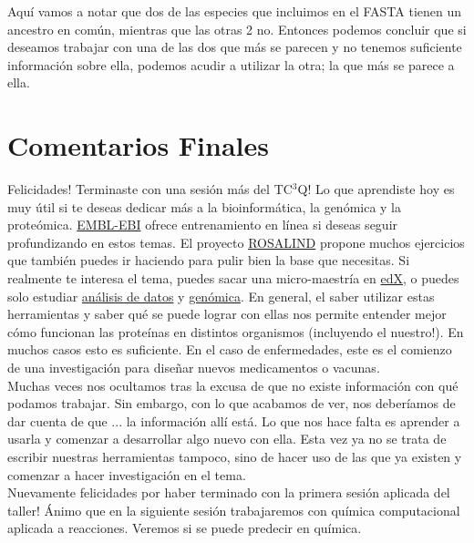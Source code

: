\documentclass[10pt,letterpaper]{article}
\begin{document}
Aqu\'i vamos a notar que dos de las especies que incluimos en el FASTA tienen un ancestro en com\'un, mientras que las otras 2 no. Entonces podemos concluir que si deseamos trabajar con una de las dos que m\'as se parecen y no tenemos suficiente informaci\'on sobre ella, podemos acudir a utilizar la otra; la que m\'as se parece a ella.

\section{Comentarios Finales}
Felicidades! Terminaste con una sesi\'on m\'as del TC$^3$Q! Lo que aprendiste hoy es muy \'util si te deseas dedicar m\'as a la bioinform\'atica, la gen\'omica y la prote\'omica. \href{http://www.ebi.ac.uk/training/online/}{EMBL-EBI} ofrece entrenamiento en l\'inea si deseas seguir profundizando en estos temas. El proyecto \href{http://rosalind.info/problems/locations/}{ROSALIND} propone muchos ejercicios que tambi\'en puedes ir haciendo para pulir bien la base que necesitas. Si realmente te interesa el tema, puedes sacar una micro-maestr\'ia en \href{https://www.edx.org/micromasters/bioinformatics}{edX}, o puedes solo estudiar \href{https://www.edx.org/xseries/data-analysis-life-sciences}{an\'alisis de datos} y \href{https://www.edx.org/xseries/genomics-data-analysis}{gen\'omica}. En general, el saber utilizar estas herramientas y saber qu\'e se puede lograr con ellas nos permite entender mejor c\'omo funcionan las prote\'inas en distintos organismos (incluyendo el nuestro!). En muchos casos esto es suficiente. En el caso de enfermedades, este es el comienzo de una investigaci\'on para dise\~nar nuevos medicamentos o vacunas.\\

Muchas veces nos ocultamos tras la excusa de que no existe informaci\'on con qu\'e podamos trabajar. Sin embargo, con lo que acabamos de ver, nos deber\'iamos de dar cuenta de que ... la informaci\'on all\'i est\'a. Lo que nos hace falta es aprender a usarla y comenzar a desarrollar algo nuevo con ella. Esta vez ya no se trata de escribir nuestras herramientas tampoco, sino de hacer uso de las que ya existen y comenzar a hacer investigaci\'on en el tema.\\

Nuevamente felicidades por haber terminado con la primera sesi\'on aplicada del taller! \'Animo que en la siguiente sesi\'on trabajaremos con qu\'imica computacional aplicada a reacciones. Veremos si se puede predecir en qu\'imica.
\end{document}
